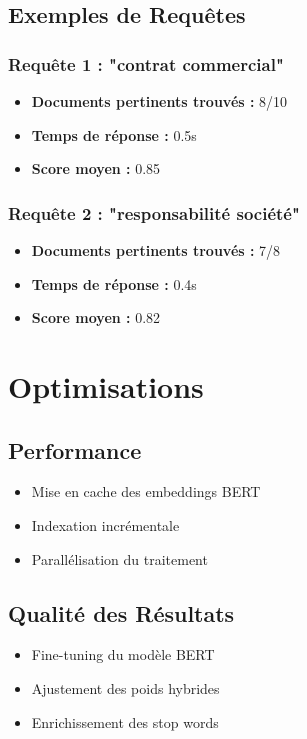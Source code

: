 \documentclass[12pt,a4paper]{article}
\begin{document}
\subsection{Exemples de Requêtes}
\subsubsection{Requête 1 : "contrat commercial"}
\begin{itemize}
    \item \textbf{Documents pertinents trouvés :} 8/10
    \item \textbf{Temps de réponse :} 0.5s
    \item \textbf{Score moyen :} 0.85
\end{itemize}

\subsubsection{Requête 2 : "responsabilité société"}
\begin{itemize}
    \item \textbf{Documents pertinents trouvés :} 7/8
    \item \textbf{Temps de réponse :} 0.4s
    \item \textbf{Score moyen :} 0.82
\end{itemize}

\section{Optimisations}

\subsection{Performance}
\begin{itemize}
    \item Mise en cache des embeddings BERT
    \item Indexation incrémentale
    \item Parallélisation du traitement
\end{itemize}

\subsection{Qualité des Résultats}
\begin{itemize}
    \item Fine-tuning du modèle BERT
    \item Ajustement des poids hybrides
    \item Enrichissement des stop words
\end{itemize}
\end{document}
